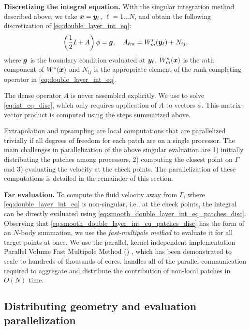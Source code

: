 \textbf{Discretizing the integral equation. }
 With the singular integration method described above, we take ${\bm{x}} = {\bm{y}}_\ell$, $\ell = 1\ldots N$, and obtain
the following discretization of \cref{eq:double_layer_int_eq}:
\begin{equation}
  \left(\frac{1}{2}I + A\right) \phi = {\bm{g}}, \quad A_{\ell m} =
  W_m^{\mathrm{s}}({\bm{y}}_\ell) + N_{ij},
  \label{eq:int_eq_disc}
\end{equation}
where ${\bm{g}}$ is the boundary condition evaluated at
${\bm{y}}_\ell$, $W^s_m({\bm{x}})$ is the $m$th component of $W^s({\bm{x}})$ and $N_{ij}$ is the appropriate element of the rank-completing
operator in \cref{eq:double_layer_int_eq}.

The dense operator $A$ is never assembled explicitly.
We use \gmres to solve \cref{eq:int_eq_disc}, which only requires
application of $A$ to vectors $\phi$.
This matrix-vector product is computed using the steps summarized above. 

Extrapolation and upsampling are local computations that are parallelized trivially if all degrees of freedom for each patch are on a single processor.
The main challenges in parallelization of the above singular
evaluation are 1) initially distributing the patches among processors,
2) computing the closest point on $\Gamma$ and 3) evaluating the
velocity at the check points. The parallelization of these
computations is detailed in the remainder of this section.

\textbf{Far evaluation. }
To compute the fluid velocity away from $\Gamma$, where
\cref{eq:double_layer_int_eq} is non-singular, i.e., at the check
points, the integral can be directly evaluated using
\cref{eq:smooth_double_layer_int_eq_patches_disc}. 
%
Observing that \cref{eq:smooth_double_layer_int_eq_patches_disc} has the form
of an $N$-body summation, we use the \textit{fast-multipole method}
\cite{greengard1987fast} to evaluate it for all target points at once. 
We use the parallel, kernel-independent implementation Parallel Volume Fast Multipole Method (\pvfmm) \cite{malhotra2015,malhotra2016algorithm}, which has been demonstrated to scale to hundreds of thousands of cores. 
\pvfmm handles all of the parallel communication required to aggregate
and distribute the contribution of non-local patches in $O(N)$ time. 

\subsection{Distributing geometry and evaluation parallelization}

